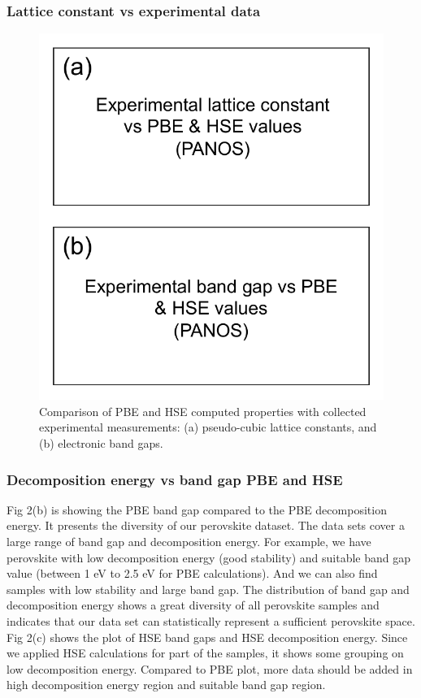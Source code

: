 \documentclass[twoside, twocolumn, 9pt, draft]{article}
\begin{document}
\subsubsection*{Lattice constant vs experimental data}
\label{sec:org29dad7a}

\begin{figure}
\centering
\includegraphics[width=.9\linewidth]{Figure3.pdf}
\caption{\label{Fig:lot_comp} Comparison of PBE and HSE computed properties with collected experimental measurements: (a) pseudo-cubic lattice constants, and (b) electronic band gaps.}
\end{figure}

\subsubsection*{Decomposition energy vs band gap PBE and HSE}
\label{sec:org77cd377}
Fig 2(b) is showing the PBE band gap compared to the PBE decomposition
energy. It presents the diversity of our perovskite dataset. The data
sets cover a large range of band gap and decomposition energy. For
example, we have perovskite with low decomposition energy (good
stability) and suitable band gap value (between 1 eV to 2.5 eV for PBE
calculations). And we can also find samples with low stability and large
band gap. The distribution of band gap and decomposition energy shows a
great diversity of all perovskite samples and indicates that our data
set can statistically represent a sufficient perovskite space. Fig 2(c)
shows the plot of HSE band gaps and HSE decomposition energy. Since we
applied HSE calculations for part of the samples, it shows some grouping
on low decomposition energy. Compared to PBE plot, more data should be
added in high decomposition energy region and suitable band gap region.
\end{document}
